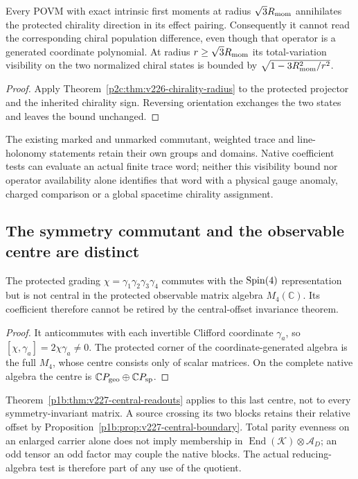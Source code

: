 \documentclass[12pt,a4paper]{article}
\begin{document}
\begin{corollary}
\label{p2e:cor:v226-chirality-visibility}
Every POVM with exact intrinsic first moments at radius $\sqrt3R_{\rm mom}$
annihilates the protected chirality direction in its effect pairing.
Consequently it cannot read the corresponding chiral population difference,
even though that operator is a generated coordinate polynomial. At radius
$r\ge\sqrt3R_{\rm mom}$ its total-variation visibility on the two normalized
chiral states is bounded by $\sqrt{1-3R_{\rm mom}^2/r^2}$.
\end{corollary}
\begin{proof}
Apply Theorem~\ref{p2c:thm:v226-chirality-radius} to the protected projector
and the inherited chirality sign. Reversing orientation exchanges the two
states and leaves the bound unchanged.
\end{proof}
The existing marked and unmarked commutant, weighted trace and line-holonomy
statements retain their own groups and domains. Native coefficient tests
can evaluate an actual finite trace word; neither this visibility bound
nor operator availability alone identifies that word with a physical gauge
anomaly, charged comparison or a global spacetime chirality assignment.


\subsection{The symmetry commutant and the observable centre are distinct}
\label{p2e:sec:v227-chirality-centre}
\begin{proposition}
\label{p2e:prop:v227-chirality-centre}
The protected grading $\chi=\gamma_1\gamma_2\gamma_3\gamma_4$ commutes
with the $\mathrm{Spin}(4)$ representation but is not central in the protected
observable matrix algebra $M_4(\mathbb C)$. Its coefficient therefore
cannot be retired by the central-offset invariance theorem.
\end{proposition}
\begin{proof}
It anticommutes with each invertible Clifford coordinate $\gamma_a$,
so $[\chi,\gamma_a]=2\chi\gamma_a\ne0$. The protected corner of the
coordinate-generated algebra is the full $M_4$, whose centre consists
only of scalar matrices. On the complete native algebra the centre is
$\mathbb CP_{\rm geo}\oplus\mathbb CP_{\rm sp}$.
\end{proof}
Theorem~\ref{p1b:thm:v227-central-readouts} applies to this last centre,
not to every symmetry-invariant matrix. A source crossing its two blocks
retains their relative offset by
Proposition~\ref{p1b:prop:v227-central-boundary}. Total parity evenness on
an enlarged carrier alone does not imply membership in
$\operatorname{End}(\mathcal K)\otimes\mathcal A_D$; an odd tensor an odd
factor may couple the native blocks. The actual reducing-algebra test is
therefore part of any use of the quotient.
\end{document}
